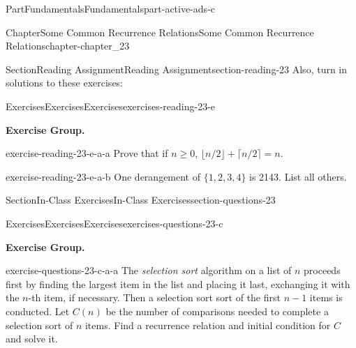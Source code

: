 \documentclass[oneside,10pt,]{book}
\numberwithin{equation}{section}
\begin{document}
\begin{partptx}{Part}{Fundamentals}{}{Fundamentals}{}{}{part-active-ads-c}
\begin{chapterptx}{Chapter}{Some Common Recurrence Relations}{}{Some Common Recurrence Relations}{}{}{chapter-chapter_23}
\begin{sectionptx}{Section}{Reading Assignment}{}{Reading Assignment}{}{}{section-reading-23}
Also, turn in solutions to these exercises:%
%
%
\typeout{************************************************}
\typeout{************************************************}
%
\begin{exercises-subsection-numberless}{Exercises}{Exercises}{}{Exercises}{}{}{exercises-reading-23-e}
\par\medskip\noindent%
\textbf{Exercise Group.}\space\space%
\begin{exercisegroup}
\begin{divisionexerciseeg}{1}{}{}{exercise-reading-23-e-a-a}%
Prove that if \(n \geq 0\), \(\lfloor n/2\rfloor +\lceil n/2\rceil = n\).%
\end{divisionexerciseeg}%
\begin{divisionexerciseeg}{2}{}{}{exercise-reading-23-e-a-b}%
One derangement of \(\{1,2,3,4\}\) is 2143.  List all others.%
\end{divisionexerciseeg}%
\end{exercisegroup}
\par\medskip\noindent
\end{exercises-subsection-numberless}
\end{sectionptx}
%
%
\typeout{************************************************}
\typeout{************************************************}
%
\begin{sectionptx}{Section}{In-Class Exercises}{}{In-Class Exercises}{}{}{section-questions-23}
%
%
%
\typeout{************************************************}
\typeout{************************************************}
%
\begin{exercises-subsection-numberless}{Exercises}{Exercises}{}{Exercises}{}{}{exercises-questions-23-c}
\par\medskip\noindent%
\textbf{Exercise Group.}\space\space%
\begin{exercisegroup}
\begin{divisionexerciseeg}{1}{}{}{exercise-questions-23-c-a-a}%
The \emph{selection sort} algorithm on a list of \(n\) proceeds first by finding the largest item in the list and placing it last, exchanging it with the \(n\)-th item, if necessary.  Then a selection sort sort of the first \(n-1\) items is conducted. Let \(C(n)\) be the number of comparisons needed to complete a selection sort of \(n\) items.   Find a recurrence relation and initial condition for \(C\) and solve it.%
\end{divisionexerciseeg}%

\end{exercisegroup}
\end{exercises-subsection-numberless}
\end{sectionptx}
\end{chapterptx}
\end{partptx}
\end{document}

